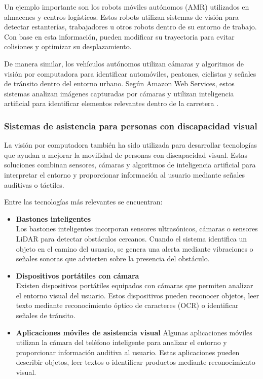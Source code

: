 Un ejemplo importante son los robots móviles autónomos (AMR) utilizados en almacenes y centros logísticos. Estos robots utilizan sistemas de visión para detectar estanterías, trabajadores u otros robots dentro de su entorno de trabajo. Con base en esta información, pueden modificar su trayectoria para evitar colisiones y optimizar su desplazamiento.

De manera similar, los vehículos autónomos utilizan cámaras y algoritmos de visión por computadora para identificar automóviles, peatones, ciclistas y señales de tránsito dentro del entorno urbano. Según Amazon Web Services, estos sistemas analizan imágenes capturadas por cámaras y utilizan inteligencia artificial para identificar elementos relevantes dentro de la carretera \cite{aws_computervision}.

\subsubsection{Sistemas de asistencia para personas con discapacidad visual}
La visión por computadora también ha sido utilizada para desarrollar tecnologías que ayudan a mejorar la movilidad de personas con discapacidad visual. Estas soluciones combinan sensores, cámaras y algoritmos de inteligencia artificial para interpretar el entorno y proporcionar información al usuario mediante señales auditivas o táctiles.

Entre las tecnologías más relevantes se encuentran:
\begin{itemize}
    \item \textbf{Bastones inteligentes}
\\
Los bastones inteligentes incorporan sensores ultrasónicos, cámaras o sensores LiDAR para detectar obstáculos cercanos. Cuando el sistema identifica un objeto en el camino del usuario, se genera una alerta mediante vibraciones o señales sonoras que advierten sobre la presencia del obstáculo.
    \item \textbf{Dispositivos portátiles con cámara}
\\
Existen dispositivos portátiles equipados con cámaras que permiten analizar el entorno visual del usuario. Estos dispositivos pueden reconocer objetos, leer texto mediante reconocimiento óptico de caracteres (OCR) o identificar señales de tránsito.
    \item \textbf{Aplicaciones móviles de asistencia visual}
Algunas aplicaciones móviles utilizan la cámara del teléfono inteligente para analizar el entorno y proporcionar información auditiva al usuario. Estas aplicaciones pueden describir objetos, leer textos o identificar productos mediante reconocimiento visual.
\end{itemize}

